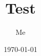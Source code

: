 \documentclass{article}
\title{Test}
\author{Me}
\date\today
\theoremstyle{remark}
\begin{document}
\maketitle
\\
\end{document}
